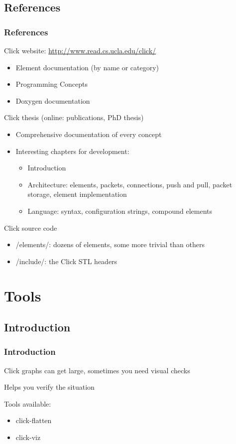\documentclass{beamer}
\begin{document}
\subsection{References} %
\label{sub:references}
\begin{frame}
\frametitle{References}
Click website: \url{http://www.read.cs.ucla.edu/click/}
\begin{itemize}
	\item Element documentation (by name or category)
	\item Programming Concepts
	\item Doxygen documentation
\end{itemize}
Click thesis (online: publications, PhD thesis)
\begin{itemize}
	\item Comprehensive documentation of every concept
	\item Interesting chapters for development:
	\begin{itemize}
		\item Introduction
		\item Architecture: elements, packets, connections, push and pull, packet storage, element implementation
		\item Language: syntax, configuration strings, compound elements
	\end{itemize}
\end{itemize}
Click source code
\begin{itemize}
	\item /elements/: dozens of elements, some more trivial than others
	\item /include/: the Click STL headers
\end{itemize}
\end{frame}

\section{Tools}
\subsection{Introduction} %
\label{sub:introduction}

\begin{frame}
\frametitle{Introduction}
Click graphs can get large, sometimes you need visual checks

Helps you verify the situation

Tools available:
\begin{itemize}
	\item click-flatten
	\item click-viz
\end{itemize}
\end{frame}
\end{document}
